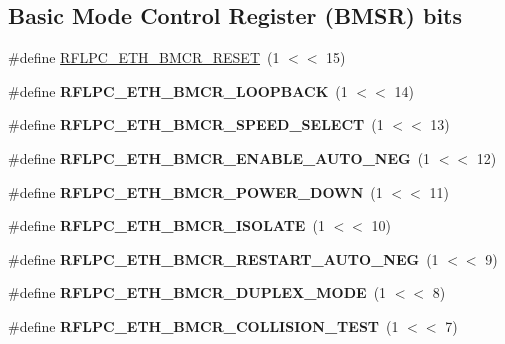 \subsection*{Basic Mode Control Register (B\-M\-S\-R) bits}
\begin{DoxyCompactItemize}
\item 
\#define \hyperlink{group__eth_ga4de02a7571f4380e10ea947edce1e325}{R\-F\-L\-P\-C\-\_\-\-E\-T\-H\-\_\-\-B\-M\-C\-R\-\_\-\-R\-E\-S\-E\-T}~(1 $<$$<$ 15)
\item 
\hypertarget{group__eth_ga677aeb88ae1bb9f4411f9337dc0214a6}{\#define {\bfseries R\-F\-L\-P\-C\-\_\-\-E\-T\-H\-\_\-\-B\-M\-C\-R\-\_\-\-L\-O\-O\-P\-B\-A\-C\-K}~(1 $<$$<$ 14)}\label{group__eth_ga677aeb88ae1bb9f4411f9337dc0214a6}

\item 
\hypertarget{group__eth_ga37c58680917bde5cc5321c6a9fb7ebff}{\#define {\bfseries R\-F\-L\-P\-C\-\_\-\-E\-T\-H\-\_\-\-B\-M\-C\-R\-\_\-\-S\-P\-E\-E\-D\-\_\-\-S\-E\-L\-E\-C\-T}~(1 $<$$<$ 13)}\label{group__eth_ga37c58680917bde5cc5321c6a9fb7ebff}

\item 
\hypertarget{group__eth_gac671dc19e5d0a81e441b43a14b548614}{\#define {\bfseries R\-F\-L\-P\-C\-\_\-\-E\-T\-H\-\_\-\-B\-M\-C\-R\-\_\-\-E\-N\-A\-B\-L\-E\-\_\-\-A\-U\-T\-O\-\_\-\-N\-E\-G}~(1 $<$$<$ 12)}\label{group__eth_gac671dc19e5d0a81e441b43a14b548614}

\item 
\hypertarget{group__eth_gaaae682c992018abf48bc960fe1258d25}{\#define {\bfseries R\-F\-L\-P\-C\-\_\-\-E\-T\-H\-\_\-\-B\-M\-C\-R\-\_\-\-P\-O\-W\-E\-R\-\_\-\-D\-O\-W\-N}~(1 $<$$<$ 11)}\label{group__eth_gaaae682c992018abf48bc960fe1258d25}

\item 
\hypertarget{group__eth_ga1d8c8434d481aa742d02d5eb72d8a45f}{\#define {\bfseries R\-F\-L\-P\-C\-\_\-\-E\-T\-H\-\_\-\-B\-M\-C\-R\-\_\-\-I\-S\-O\-L\-A\-T\-E}~(1 $<$$<$ 10)}\label{group__eth_ga1d8c8434d481aa742d02d5eb72d8a45f}

\item 
\hypertarget{group__eth_gac98690d26fdbea90ab5d45b77ea25db6}{\#define {\bfseries R\-F\-L\-P\-C\-\_\-\-E\-T\-H\-\_\-\-B\-M\-C\-R\-\_\-\-R\-E\-S\-T\-A\-R\-T\-\_\-\-A\-U\-T\-O\-\_\-\-N\-E\-G}~(1 $<$$<$ 9)}\label{group__eth_gac98690d26fdbea90ab5d45b77ea25db6}

\item 
\hypertarget{group__eth_ga6ff4a02217de5af0af5e1da6600c0be2}{\#define {\bfseries R\-F\-L\-P\-C\-\_\-\-E\-T\-H\-\_\-\-B\-M\-C\-R\-\_\-\-D\-U\-P\-L\-E\-X\-\_\-\-M\-O\-D\-E}~(1 $<$$<$ 8)}\label{group__eth_ga6ff4a02217de5af0af5e1da6600c0be2}

\item 
\hypertarget{group__eth_gaf732bade66d74e9c9200f72ed59a8729}{\#define {\bfseries R\-F\-L\-P\-C\-\_\-\-E\-T\-H\-\_\-\-B\-M\-C\-R\-\_\-\-C\-O\-L\-L\-I\-S\-I\-O\-N\-\_\-\-T\-E\-S\-T}~(1 $<$$<$ 7)}\label{group__eth_gaf732bade66d74e9c9200f72ed59a8729}

\end{DoxyCompactItemize}
